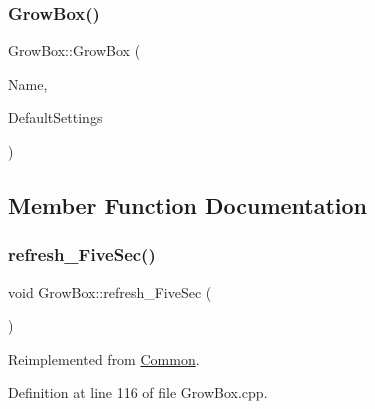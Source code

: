 \subsubsection{\texorpdfstring{Grow\+Box()}{GrowBox()}\hspace{0.1cm}{\footnotesize\ttfamily [2/2]}}
{\footnotesize\ttfamily Grow\+Box\+::\+Grow\+Box (\begin{DoxyParamCaption}\item[{const \+\_\+\+\_\+\+Flash\+String\+Helper $\ast$}]{Name,  }\item[{\hyperlink{struct_settings_1_1_grow_box_settings}{Settings\+::\+Grow\+Box\+Settings} $\ast$}]{Default\+Settings }\end{DoxyParamCaption})}



\subsection{Member Function Documentation}
\mbox{\label{class_grow_box_ad3c74a1bbf508489f113215d1f4ae43f}} 
\subsubsection{\texorpdfstring{refresh\+\_\+\+Five\+Sec()}{refresh\_FiveSec()}\hspace{0.1cm}{\footnotesize\ttfamily [1/2]}}
{\footnotesize\ttfamily void Grow\+Box\+::refresh\+\_\+\+Five\+Sec (\begin{DoxyParamCaption}{ }\end{DoxyParamCaption})\hspace{0.3cm}{\ttfamily [virtual]}}



Reimplemented from \hyperlink{class_common_a604ab36b3a1d9a5bcfcb225149c82f90}{Common}.



Definition at line 116 of file Grow\+Box.\+cpp.

